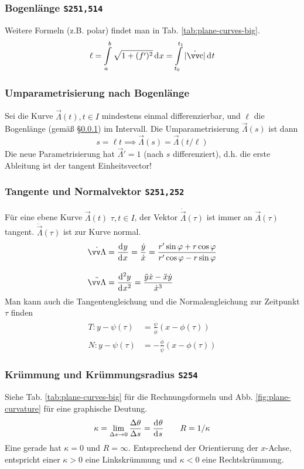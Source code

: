 \documentclass[margin=small, twocolumn]{hsrzf}
\numberwithin{equation}{subsection}
\newcommand{\brpage}[1]{\textcolor{red!70!black}{\small\texttt{S#1}}}
\begin{document}
\subsubsection{Bogenl\"ange \brpage{251,514}} \label{sec:arc-length}
Weitere Formeln (z.B. polar) findet man in Tab. \ref{tab:plane-curves-big}.
\[
    \ell = \int\limits_a^b \sqrt{1 + (f')^2} \di{x} 
    = \int\limits_{t_0}^{t_1} |\dot{\vec{c}}| \di{t}
\]

\subsubsection{Umparametrisierung nach Bogenl\"ange}
Sei die Kurve \(\vec{\Lambda}(t), t \in I\) mindestens einmal differenzierbar, und \(\ell\) die Bogenl\"ange (gem\"a{\ss} \S\ref{sec:arc-length}) im Intervall. Die Umparametrisierung \(\vec{\Lambda}(s)\) ist dann
\[
    s = \ell t \implies \vec{\Lambda}(s) = \vec{\Lambda}(t/\ell)
\]
Die neue Parametrisierung hat \(\vec{\Lambda}' = 1\) (nach \(s\) differenziert), d.h. die erste Ableitung ist der tangent Einheitsvector!

\subsubsection{Tangente und Normalvektor \brpage{251,252}}
F\"ur eine ebene Kurve \(\vec{\Lambda}(t)\) \(\tau, t \in I\), der Vektor \(\dot{\vec\Lambda}(\tau)\) ist immer an \(\vec{\Lambda}(\tau)\) tangent. \(\ddot{\vec{\Lambda}}(\tau)\) ist zur Kurve normal.
\begin{align*}
    \dot{\vec{\Lambda}}
    &= \deriv{y}{x} 
    = \frac{\dot{y}}{\dot{x}} 
    = \frac{r'\sin\varphi + r\cos\varphi}{r'\cos\varphi - r\sin\varphi}
    \\[.9em]
    \ddot{\vec{\Lambda}}
    &= \deriv[2]{y}{x}
    = \frac{\ddot{y}\dot{x} - \ddot{x}\dot{y}}{\dot{x}^3}
\end{align*}
Man kann auch die Tangentengleichung und die Normalengleichung zur Zeitpunkt \(\tau\) finden
\begin{align*}
    T: y - \psi(\tau) &= \frac{\dot{\psi}}{\dot{\phi}}(x - \phi(\tau)) \\
    N: y - \psi(\tau) &= -\frac{\dot{\phi}}{\dot{\psi}}(x - \phi(\tau))
\end{align*}

\subsubsection{Kr\"ummung und Kr\"ummungsradius \brpage{254}}
Siehe Tab. \ref{tab:plane-curves-big} f\"ur die Rechnungsformeln und Abb. \ref{fig:plane-curvature} f\"ur eine graphische Deutung.
\[
    \kappa 
    = \lim_{\Delta s\to 0} \frac{\Delta \theta}{\Delta s}
    = \frac{\mathrm{d}^{} \theta}{\mathrm{d}^{} s^{}} 
    \qquad
    R = 1/\kappa
\]
Eine gerade hat \(\kappa = 0\) und \(R = \infty\).
Entsprechend der Orientierung der \(x\)-Achse, entspricht einer \(\kappa > 0\) eine Linkskr\"ummung und \(\kappa < 0\) eine Rechtskr\"ummung.
\end{document}
